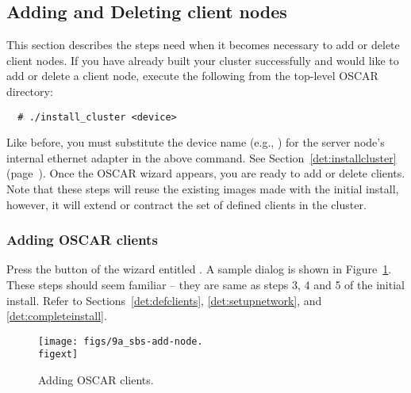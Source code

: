 
\subsection{Adding and Deleting client nodes}

This section describes the steps need when it becomes necessary to add
or delete client nodes. If you have already built your cluster
successfully and would like to add or delete a client node, execute
the following from the top-level OSCAR directory:

\begin{verbatim}
  # ./install_cluster <device>
\end{verbatim}

Like before, you must substitute the device name (e.g., )
for the server node's internal ethernet adapter in the above command.
See Section~\ref{det:installcluster}
(page~\pageref{det:installcluster}). Once the OSCAR wizard appears,
you are ready to add or delete clients. Note that these steps will
reuse the existing images made with the initial install, however, it
will extend or contract the set of defined clients in the cluster.


\subsubsection{Adding OSCAR clients}
\label{det:adding-clients}

Press the button of the wizard entitled . A
sample dialog is shown in Figure~\ref{fig:detailed-add-node}. These
steps should seem familiar -- they are same as steps 3, 4 and 5 of the
initial install. Refer to Sections~\ref{det:defclients},
\ref{det:setupnetwork}, and \ref{det:completeinstall}.

\begin{figure}[htbp]
  \begin{center}
    \texttt{[image: figs/9a\_sbs-add-node.\\figext]}
    \caption{Adding OSCAR clients.}
    \label{fig:detailed-add-node}
  \end{center}
\end{figure}


